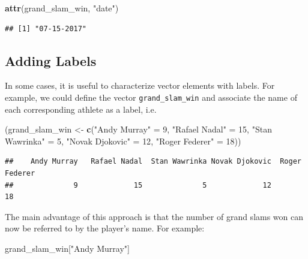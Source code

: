 \documentclass[12pt,]{krantz}
\newenvironment{Shaded}{\begin{snugshade}}{\end{snugshade}}
\newcommand{\KeywordTok}[1]{\textcolor[rgb]{0.27,0.27,0.27}{\textbf{#1}}}
\newcommand{\DecValTok}[1]{\textcolor[rgb]{0.06,0.06,0.06}{#1}}
\newcommand{\StringTok}[1]{\textcolor[rgb]{0.5,0.5,0.5}{#1}}
\newcommand{\NormalTok}[1]{#1}
\begin{document}
\begin{Shaded}
\begin{Highlighting}[]
\KeywordTok{attr}\NormalTok{(grand_slam_win, }\StringTok{"date"}\NormalTok{)}
\end{Highlighting}
\end{Shaded}

\begin{verbatim}
## [1] "07-15-2017"
\end{verbatim}

\subsection{Adding Labels}\label{addlab}

In some cases, it is useful to characterize vector elements with labels.
For example, we could define the vector \texttt{grand\_slam\_win} and
associate the name of each corresponding athlete as a label, i.e.

\begin{Shaded}
\begin{Highlighting}[]
\NormalTok{(grand_slam_win <-}\StringTok{ }\KeywordTok{c}\NormalTok{(}\StringTok{"Andy Murray"}\NormalTok{ =}\StringTok{ }\DecValTok{9}\NormalTok{, }\StringTok{"Rafael Nadal"}\NormalTok{ =}\StringTok{ }\DecValTok{15}\NormalTok{, }
                   \StringTok{"Stan Wawrinka"}\NormalTok{ =}\StringTok{ }\DecValTok{5}\NormalTok{, }\StringTok{"Novak Djokovic"}\NormalTok{ =}\StringTok{ }\DecValTok{12}\NormalTok{, }
                   \StringTok{"Roger Federer"}\NormalTok{ =}\StringTok{ }\DecValTok{18}\NormalTok{))}
\end{Highlighting}
\end{Shaded}

\begin{verbatim}
##    Andy Murray   Rafael Nadal  Stan Wawrinka Novak Djokovic  Roger Federer 
##              9             15              5             12             18
\end{verbatim}

The main advantage of this approach is that the number of grand slams
won can now be referred to by the player's name. For example:

\begin{Shaded}
\begin{Highlighting}[]
\NormalTok{grand_slam_win[}\StringTok{"Andy Murray"}\NormalTok{]}
\end{Highlighting}
\end{Shaded}
\end{document}
